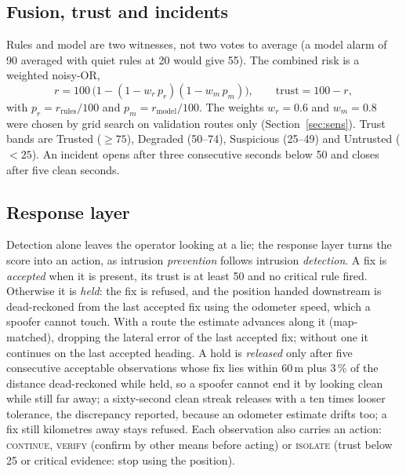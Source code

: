 \documentclass[conference]{IEEEtran}
\begin{document}
\subsection{Fusion, trust and incidents}
Rules and model are two witnesses, not two votes to average (a model alarm of 90 averaged with quiet rules at 20 would give 55). The combined risk is a weighted noisy-OR,
\begin{equation}
r = 100\,\bigl(1-(1-w_r\,p_r)(1-w_m\,p_m)\bigr),\qquad \mathrm{trust}=100-r,
\label{eq:fusion}
\end{equation}
with $p_r=r_{\mathrm{rules}}/100$ and $p_m=r_{\mathrm{model}}/100$. The weights $w_r=0.6$ and $w_m=0.8$ were chosen by grid search on validation routes only (Section~\ref{sec:sens}). Trust bands are Trusted ($\ge75$), Degraded (50--74), Suspicious (25--49) and Untrusted ($<25$). An incident opens after three consecutive seconds below 50 and closes after five clean seconds.

\subsection{Response layer}
Detection alone leaves the operator looking at a lie; the response layer turns the score into an action, as intrusion \emph{prevention} follows intrusion \emph{detection}. A fix is \emph{accepted} when it is present, its trust is at least 50 and no critical rule fired. Otherwise it is \emph{held}: the fix is refused, and the position handed downstream is dead-reckoned from the last accepted fix using the odometer speed, which a spoofer cannot touch. With a route the estimate advances along it (map-matched), dropping the lateral error of the last accepted fix; without one it continues on the last accepted heading. A hold is \emph{released} only after five consecutive acceptable observations whose fix lies within 60\,m plus 3\,\% of the distance dead-reckoned while held, so a spoofer cannot end it by looking clean while still far away; a sixty-second clean streak releases with a ten times looser tolerance, the discrepancy reported, because an odometer estimate drifts too; a fix still kilometres away stays refused. Each observation also carries an action: \textsc{continue}, \textsc{verify} (confirm by other means before acting) or \textsc{isolate} (trust below 25 or critical evidence: stop using the position).
\end{document}
